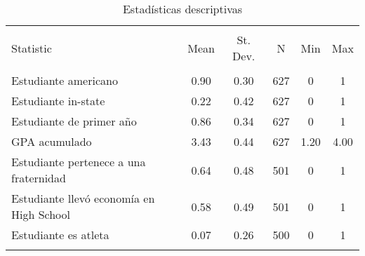 
\begin{table}[!htbp] \centering 
  \caption{Estadísticas descriptivas} 
  \label{} 
\begin{tabular}{@{\extracolsep{5pt}}lccccc} 
\\[-1.8ex]\hline 
\hline \\[-1.8ex] 
Statistic & \multicolumn{1}{c}{Mean} & \multicolumn{1}{c}{St. Dev.} & \multicolumn{1}{c}{N} & \multicolumn{1}{c}{Min} & \multicolumn{1}{c}{Max} \\ 
\hline \\[-1.8ex] 
Estudiante americano & 0.90 & 0.30 & 627 & 0 & 1 \\ 
Estudiante in-state & 0.22 & 0.42 & 627 & 0 & 1 \\ 
Estudiante de primer año & 0.86 & 0.34 & 627 & 0 & 1 \\ 
GPA acumulado & 3.43 & 0.44 & 627 & 1.20 & 4.00 \\ 
Estudiante pertenece a una fraternidad & 0.64 & 0.48 & 501 & 0 & 1 \\ 
Estudiante llevó economía en High School & 0.58 & 0.49 & 501 & 0 & 1 \\ 
Estudiante es atleta & 0.07 & 0.26 & 500 & 0 & 1 \\ 
\hline \\[-1.8ex] 
\end{tabular} 
\end{table} 
